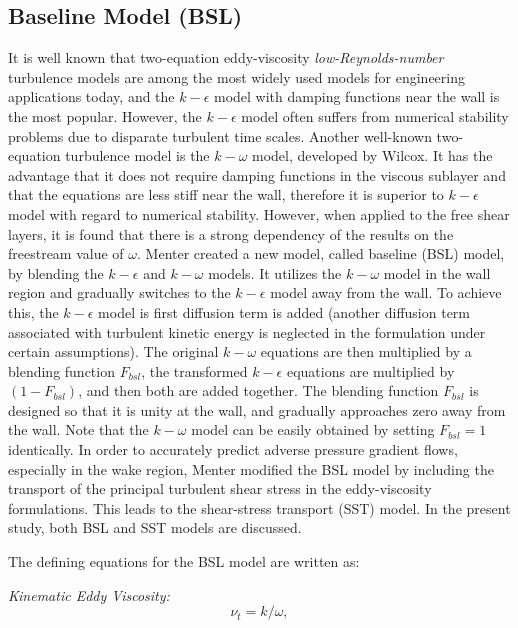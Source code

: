 \subsection{Baseline Model (BSL)}

It is well known that two-equation eddy-viscosity
{\sl low-Reynolds-number\/} turbulence models are among the most widely
used models for engineering applications today, and the $k-\epsilon$
model with damping functions near the wall is the most popular.
However, the $k-\epsilon$ model often suffers from numerical stability
problems due to disparate turbulent time scales.  Another well-known
two-equation turbulence model is the $k-\omega$ model, developed by
Wilcox\cite{Wilcox.88}.  It has the advantage that it does not
require damping functions in the viscous sublayer and that the
equations are less stiff near the wall, therefore it is superior to 
$k-\epsilon$ model with regard to numerical stability.  However, when
applied to the free shear layers, it is found that there is a strong
dependency of the results on the freestream value of
$\omega$\cite{Wilcox.91,Menter.92}.  Menter created a new model,
called baseline (BSL) model, by blending the $k-\epsilon$ and
$k-\omega$ models\cite{Menter.94}.  It utilizes the $k-\omega$ model
in the wall region and gradually switches to the $k-\epsilon$ model
away from the wall.  To achieve this, the $k-\epsilon$ model is first
diffusion term is added (another diffusion term associated with
turbulent kinetic energy is neglected in the formulation under certain
assumptions\cite{WilcoxBook}). The original $k-\omega$ equations are
then multiplied by a blending function $F_{bsl}$, the transformed
$k-\epsilon$ equations are multiplied by $(1-F_{bsl})$, and then both
are added together.  The blending function $F_{bsl}$ is designed so
that it is unity at the wall, and gradually approaches zero away from
the wall.  Note that the $k-\omega$ model can be easily obtained by
setting $F_{bsl} = 1$ identically.  In order to accurately predict
adverse pressure gradient flows, especially in the wake region,
Menter\cite{Menter.94} modified the BSL model by including the transport of
the principal turbulent shear stress\cite{Jon-King.85} in the
eddy-viscosity formulations. This leads to the shear-stress transport
(SST) model.  In the present study, both BSL and SST models are
discussed.

The defining equations for the BSL model are written as:

{\it Kinematic Eddy Viscosity:} 
\begin{equation}
\nu_t = k/\omega,
\end{equation}

